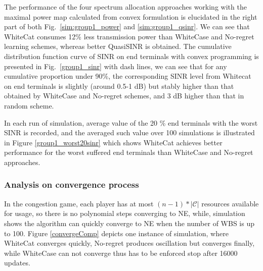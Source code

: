 The performance of the four spectrum allocation approaches working with the maximal power map calculated from convex formulation is elucidated in the right part of both Fig.~\ref{sim:group1_power} and \ref{sim:group1_qsinr}. 
We can see that WhiteCat consumes 12\% less transmission power than WhiteCase and No-regret learning schemes, whereas better QuasiSINR is obtained. 
The cumulative distribution function curve of SINR on end terminals with convex programming is presented in Fig.~\ref{group1_sinr} with dash lines, we can see that for any cumulative proportion under 90\%, the corresponding SINR level from Whitecat on end terminals is slightly (around 0.5-1 dB) but stably higher than that obtained by WhiteCase and No-regret schemes, and 3 dB higher than that in random scheme.

In each run of simulation, average value of the 20 \% end terminals with the worst SINR is recorded, and the averaged such value over 100 simulations is illustrated in Figure \ref{group1_worst20sinr} which shows WhiteCat achieves better performance for the worst suffered end terminals than WhiteCase and No-regret approaches.




\subsubsection*{Analysis on convergence process}

In the congestion game, each player has at most $(n-1)*|\mathcal{C}|$ resources available for usage, so there is no polynomial steps converging to NE, while, simulation shows the algorithm can quickly converge to NE when the number of WBS is up to 100. 
Figure \ref{convergeComp} depicts one instance of simulation, where WhiteCat converges quickly, No-regret produces oscillation but converges finally, while WhiteCase can not converge thus has to be enforced stop after 16000 updates. %

